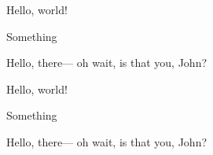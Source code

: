 \documentclass{article}
\begin{document}
Hello, world!
    
Something


Hello, there---%
oh wait, is that you, John?



\bigskip


Hello, world!
    
Something


Hello, there---%
oh wait, is that you, John?
\end{document}
